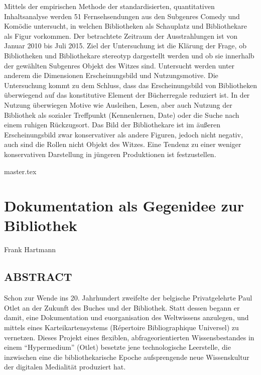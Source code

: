 \documentclass[10.5pt,a5paper,twoside]{memoir}
\makeatletter
\DeclareRobustCommand\authortoctext[1]{%
{\addvspace{20pt}\nopagebreak\leftskip0em\relax
\rightskip \@tocrmarg\relax
\noindent\itshape#1\par\addvspace{-7pt}}}
\newcommand\authortoc[1]{%
  \gdef\chapterauthor{#1}%
  \addtocontents{toc}{\authortoctext{#1}}}
\makeatother
\begin{document}
{\small Mittels der empirischen Methode der standardisierten, quantitativen
Inhaltsanalyse werden 51 Fernsehsendungen aus den Subgenres Comedy und
Komödie untersucht, in welchen Bibliotheken als Schauplatz und
Bibliothekare als Figur vorkommen. Der betrachtete Zeitraum der
Ausstrahlungen ist von Januar 2010 bis Juli 2015. Ziel der Untersuchung
ist die Klärung der Frage, ob Bibliotheken und Bibliothekare stereotyp
dargestellt werden und ob sie innerhalb der gewählten Subgenres Objekt
des Witzes sind. Untersucht werden unter anderem die Dimensionen
Erscheinungsbild und Nutzungsmotive. Die Untersuchung kommt zu dem
Schluss, dass das Erscheinungsbild von Bibliotheken überwiegend auf das
konstitutive Element der Bücherregale reduziert ist. In der Nutzung
überwiegen Motive wie Ausleihen, Lesen, aber auch Nutzung der Bibliothek
als sozialer Treffpunkt (Kennenlernen, Date) oder die Suche nach einem
ruhigen Rückzugsort. Das Bild der Bibliothekare ist im äußeren
Erscheinungsbild zwar konservativer als andere Figuren, jedoch nicht
negativ, auch sind die Rollen nicht Objekt des Witzes. Eine Tendenz zu
einer weniger konservativen Darstellung in jüngeren Produktionen ist
festzustellen.}

\newpage 

{master.tex}

\authortoc{\\Frank Hartmann}
\chapter*[Dokumentation als Gegenidee zur Bibliothek]{Dokumentation als Gegenidee zur Bibliothek}
\begin{flushright}
{\large Frank Hartmann}
\end{flushright}

\vspace{5mm}

\section*{ABSTRACT}

{\small
	Schon zur Wende ins 20. Jahrhundert zweifelte der belgische Privatgelehrte Paul Otlet an der Zukunft des Buches und der Bibliothek. Statt dessen begann er damit, eine Dokumentation und euorganisation des Weltwissens anzulegen, und mittels eines Karteikartensystems (Répertoire Bibliographique Universel) zu vernetzen. Dieses Projekt eines flexiblen, abfrageorientierten Wissensbestandes in einem \enquote{Hypermedium} (Otlet) besetzte jene technologische Leerstelle, die inzwischen eine die bibliothekarische Epoche aufsprengende neue Wissenskultur der digitalen Medialität produziert hat.}
\end{document}
